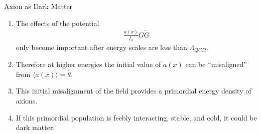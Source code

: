 \documentclass{beamer}
\begin{document}
\begin{frame}{Axion as Dark Matter}
\begin{enumerate}
\item The effects of the potential
\begin{align*}
\frac{a(x)}{f_a}G\tilde G
\end{align*}
only become important after energy scales are less than $\Lambda_{QCD}$.
\item Therefore at higher energies the initial value of $a(x)$ can be 
``misaligned'' from $\langle a(x) \rangle = \bar{\theta}$.
\item This initial misalignment of the field provides a primordial energy density of axions.
\item If this primordial population is feebly interacting, stable, and cold, it could be dark matter.
\end{enumerate}

\end{frame}

\end{document}
